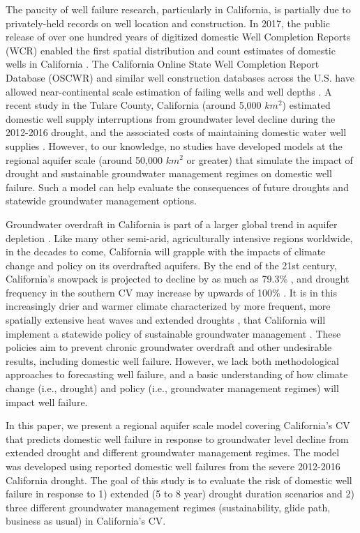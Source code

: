 The paucity of well failure research, particularly in California, is partially due to privately-held records on well location and construction. In 2017, the public release of over one hundred years of digitized domestic Well Completion Reports (WCR) enabled the first spatial distribution and count estimates of domestic wells in California \citep{Johnson2015, Johnson2017}. The California Online State Well Completion Report Database (OSCWR) \citep{oswcr} and similar well construction databases across the U.S. have allowed near-continental scale estimation of failing wells \citep{Perrone2017} and well depths \citep{Perrone2019}. A recent study in the Tulare County, California (around 5,000 $km^2$) estimated domestic well supply interruptions from groundwater level decline during the 2012-2016 drought, and the associated costs of maintaining domestic water well supplies \citep{Gailey2019}. However, to our knowledge, no studies have developed models at the regional aquifer scale (around 50,000 $km^2$ or greater) that simulate the impact of drought and sustainable groundwater management regimes on domestic well failure. Such a model can help evaluate the consequences of future droughts and statewide groundwater management options. 

Groundwater overdraft in California is part of a larger global trend in aquifer depletion \citep{Famiglietti2014, wada2010global, doll2012impact, siebert2010groundwater}. Like many other semi-arid, agriculturally intensive regions worldwide, in the decades to come, California will grapple with the impacts of climate change and policy on its overdrafted aquifers. By the end of the 21st century, California's snowpack is projected to decline by as much as 79.3\% \citep{Rhoades2018}, and drought frequency in the southern CV may increase by upwards of 100\% \citep{Swain2018}. It is in this increasingly drier and warmer climate \citep{Diffenbaugh2015, Cook2015} characterized by more frequent, more spatially extensive heat waves and extended droughts \citep{Tebaldi2006, Lobell2011}, that California will implement a statewide policy of sustainable groundwater management \citep{SGMA}. These policies aim to prevent chronic groundwater overdraft and other undesirable results, including domestic well failure. However, we lack both methodological approaches to forecasting well failure, and a basic understanding of how climate change (i.e., drought) and policy (i.e., groundwater management regimes) will impact well failure.  

In this paper, we present a regional aquifer scale model covering California's CV that predicts domestic well failure in response to groundwater level decline from extended drought and different groundwater management regimes. The model was developed using reported domestic well failures from the severe 2012-2016 California drought. The goal of this study is to evaluate the risk of domestic well failure in response to 1) extended (5 to 8 year) drought duration scenarios and 2) three different groundwater management regimes (sustainability, glide path, business as usual) in California's CV.   


